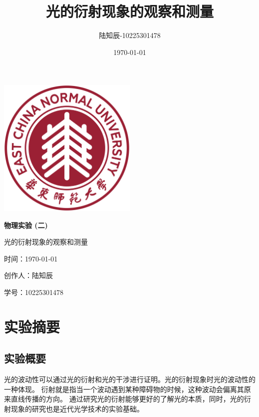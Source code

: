 \documentclass{ctexart}
\title{光的衍射现象的观察和测量}
\author{陆知辰-10225301478}
\date{\today}
\begin{document}
\begin{titlepage}
  \centering
  \includegraphics[width=0.5\textwidth]{ecnu.png}
  
  \vspace*{\baselineskip}
  
  \Huge\textbf{物\quad 理\quad 实\quad 验 \quad (二)}
  \vspace*{0.3\baselineskip}
  
  \huge 光的衍射现象的观察和测量
  
  \vspace*{2\baselineskip}
  
  \large 时间：\today
  
  \vspace*{\baselineskip}
  
  \large 创作人：陆知辰
  
  \vspace*{\baselineskip}
  
  \large 学号：10225301478
  
\end{titlepage}
\newpage
\tableofcontents
\newpage
\section{实验摘要}
  \subsection{实验概要}
  光的波动性可以通过光的衍射和光的干涉进行证明。光的衍射现象时光的波动性的一种体现。
  衍射就是指当一个波动遇到某种障碍物的时候，这种波动会偏离其原来直线传播的方向。
  通过研究光的衍射能够更好的了解光的本质，同时，光的衍射现象的研究也是近代光学技术的实验基础。
\end{document}
